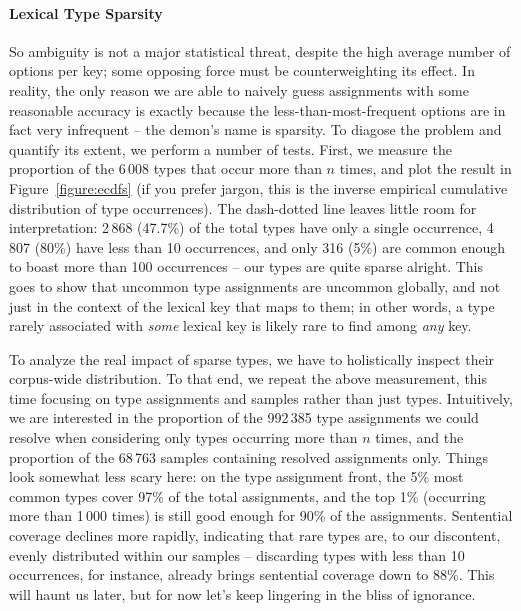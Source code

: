 \paragraph{Lexical Type Sparsity}
So ambiguity is not a major statistical threat, despite the high average number of options per key; some opposing force must be counterweighting its effect.
In reality, the only reason we are able to naively guess assignments with some reasonable accuracy is exactly because the less-than-most-frequent options are in fact very infrequent -- the demon's name is sparsity.
To diagose the problem and quantify its extent, we perform a number of tests.
First, we measure the proportion of the 6\,008 types that occur more than $n$ times, and plot the result in Figure~\ref{figure:ecdfs} (if you prefer jargon, this is the inverse empirical cumulative distribution of type occurrences).
The dash-dotted line leaves little room for interpretation: 2\,868 (47.7\%) of the total types have only a single occurrence, 4\,807 (80\%)  have less than 10 occurrences, and only 316 (5\%) are common enough to boast more than 100 occurrences -- our types are quite sparse alright.
This goes to show that uncommon type assignments are uncommon globally, and not just in the context of the lexical key that maps to them; in other words, a type rarely associated with \textit{some} lexical key is likely rare to find among \textit{any} key.

To analyze the real impact of sparse types, we have to holistically inspect their corpus-wide distribution.
To that end, we repeat the above measurement, this time focusing on type assignments and samples rather than just types.
Intuitively, we are interested in the proportion of the 992\,385 type assignments we could resolve when considering only types occurring more than $n$ times, and the proportion of the 68\,763 samples containing resolved assignments only. 
Things look somewhat less scary here: on the type assignment front, the 5\% most common types cover 97\% of the total assignments, and the top 1\% (occurring more than 1\,000 times) is still good enough for 90\% of the assignments.
Sentential coverage declines more rapidly, indicating that rare types are, to our discontent, evenly distributed within our samples -- discarding types with less than 10 occurrences, for instance, already brings sentential coverage down to 88\%.
This will haunt us later, but for now let's keep lingering in the bliss of ignorance.

